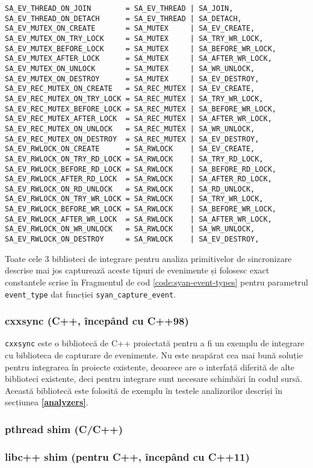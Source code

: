 \begin{lstlisting}[caption=Tipurile de evenimente pentru primitivele de
                           sincronizare, label=code:syan-event-types]
SA_EV_THREAD_ON_JOIN        = SA_EV_THREAD | SA_JOIN,
SA_EV_THREAD_ON_DETACH      = SA_EV_THREAD | SA_DETACH,
SA_EV_MUTEX_ON_CREATE       = SA_MUTEX     | SA_EV_CREATE,
SA_EV_MUTEX_ON_TRY_LOCK     = SA_MUTEX     | SA_TRY_WR_LOCK,
SA_EV_MUTEX_BEFORE_LOCK     = SA_MUTEX     | SA_BEFORE_WR_LOCK,
SA_EV_MUTEX_AFTER_LOCK      = SA_MUTEX     | SA_AFTER_WR_LOCK,
SA_EV_MUTEX_ON_UNLOCK       = SA_MUTEX     | SA_WR_UNLOCK,
SA_EV_MUTEX_ON_DESTROY      = SA_MUTEX     | SA_EV_DESTROY,
SA_EV_REC_MUTEX_ON_CREATE   = SA_REC_MUTEX | SA_EV_CREATE,
SA_EV_REC_MUTEX_ON_TRY_LOCK = SA_REC_MUTEX | SA_TRY_WR_LOCK,
SA_EV_REC_MUTEX_BEFORE_LOCK = SA_REC_MUTEX | SA_BEFORE_WR_LOCK,
SA_EV_REC_MUTEX_AFTER_LOCK  = SA_REC_MUTEX | SA_AFTER_WR_LOCK,
SA_EV_REC_MUTEX_ON_UNLOCK   = SA_REC_MUTEX | SA_WR_UNLOCK,
SA_EV_REC_MUTEX_ON_DESTROY  = SA_REC_MUTEX | SA_EV_DESTROY,
SA_EV_RWLOCK_ON_CREATE      = SA_RWLOCK    | SA_EV_CREATE,
SA_EV_RWLOCK_ON_TRY_RD_LOCK = SA_RWLOCK    | SA_TRY_RD_LOCK,
SA_EV_RWLOCK_BEFORE_RD_LOCK = SA_RWLOCK    | SA_BEFORE_RD_LOCK,
SA_EV_RWLOCK_AFTER_RD_LOCK  = SA_RWLOCK    | SA_AFTER_RD_LOCK,
SA_EV_RWLOCK_ON_RD_UNLOCK   = SA_RWLOCK    | SA_RD_UNLOCK,
SA_EV_RWLOCK_ON_TRY_WR_LOCK = SA_RWLOCK    | SA_TRY_WR_LOCK,
SA_EV_RWLOCK_BEFORE_WR_LOCK = SA_RWLOCK    | SA_BEFORE_WR_LOCK,
SA_EV_RWLOCK_AFTER_WR_LOCK  = SA_RWLOCK    | SA_AFTER_WR_LOCK,
SA_EV_RWLOCK_ON_WR_UNLOCK   = SA_RWLOCK    | SA_WR_UNLOCK,
SA_EV_RWLOCK_ON_DESTROY     = SA_RWLOCK    | SA_EV_DESTROY,
\end{lstlisting}

Toate cele 3 biblioteci de integrare pentru analiza primitivelor de
sincronizare descrise mai jos capturează aceste tipuri de evenimente și
folosesc exact constantele scrise în Fragmentul de cod
\ref{code:syan-event-types} pentru parametrul \lstinline{event_type} dat
funcției \lstinline{syan_capture_event}.

\subsubsection{cxxsync (C++, începând cu C++98)}
\lstinline{cxxsync} este o bibliotecă de C++ proiectată pentru a fi un
exemplu de integrare cu biblioteca de capturare de evenimente. Nu este
neapărat cea mai bună soluție pentru integrarea în proiecte existente,
deoarece are o interfață diferită de alte biblioteci existente, deci
pentru integrare sunt necesare schimbări în codul sursă. Această
bibliotecă este folosită de exemplu în testele analizorilor descriși în
secțiunea \textbf{\ref{analyzers}}.

\subsubsection{pthread shim (C/C++)}

\subsubsection{libc++ shim (pentru C++, începând cu C++11)}
